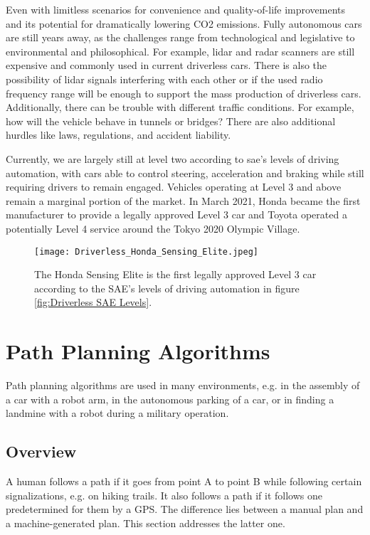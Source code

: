 Even with limitless scenarios for convenience and quality-of-life improvements and its potential for dramatically lowering CO2 emissions. \cite{driverless_study_three_revolutions}
Fully autonomous cars are still years away, as the challenges range from technological and legislative to environmental and philosophical. For example, lidar and radar scanners are still expensive and commonly used in current driverless cars. There is also the possibility of lidar signals interfering with each other or if the used radio frequency range will be enough to support the mass production of driverless cars. Additionally, there can be trouble with different traffic conditions. For example, how will the vehicle behave in tunnels or bridges? There are also additional hurdles like laws, regulations, and accident liability. \cite{driverless_what_is_an_autonomous_car}

Currently, we are largely still at level two according to \acrshort{sae}'s levels of driving automation, with cars able to control steering, acceleration and braking while still requiring drivers to remain engaged. Vehicles operating at Level 3 and above remain a marginal portion of the market. \cite{driverless_whats_the_status_of_self_driving_cars}
In March 2021, Honda became the first manufacturer to provide a legally approved Level 3 car and Toyota operated a potentially Level 4 service around the Tokyo 2020 Olympic Village. \cite{driverless_honda_sensing_elite} \cite{driverless_toyota_olympics}
\begin{figure}[H]
    \centering
    \texttt{[image: Driverless\_Honda\_Sensing\_Elite.jpeg]}
    \caption{The Honda Sensing Elite is the first legally approved Level 3 car according to the SAE's levels of driving automation in figure \ref{fig:Driverless SAE Levels}.}
    \label{fig:Driverless Honda Sensing Elite}
\end{figure}

\section{Path Planning Algorithms} \label{sec:Path Planning Algorithms}
Path planning algorithms are used in many environments, e.g. in the assembly of a car with a robot arm, in the autonomous parking of a car, or in finding a landmine with a robot during a military operation.

\subsection{Overview} \label{sec:Overview Path Planning Algorithms}
A human follows a path if it goes from point A to point B while following certain signalizations, e.g. on hiking trails. It also follows a path if it follows one predetermined for them by a GPS. The difference lies between a manual plan and a machine-generated plan. This section addresses the latter one.

